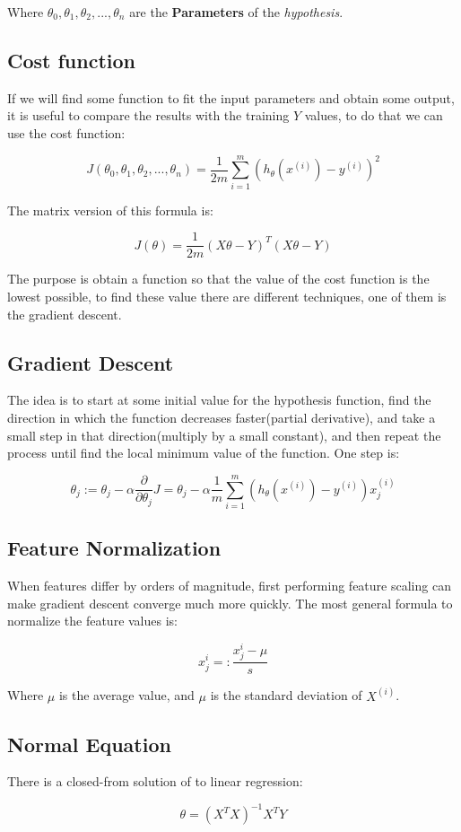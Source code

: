 \documentclass[english]{article}
\begin{document}
Where $\theta_{0},\theta_{1},\theta_{2},...,\theta_{n}$ are the
\textbf{Parameters} of the \textit{hypothesis}.

\subsection{Cost function}
If we will find some function to fit the input parameters and obtain some output,
it is useful to compare the results with the training $Y$ values, to do that we
can use the cost function:

\begin{equation}
J(\theta_{0},\theta_{1},\theta_{2},...,\theta_{n})=
\frac{1}{2m}\sum_{i=1}^{m}(h_{\theta}(x^{(i)})-y^{(i)})^{2}
\end{equation}

The matrix version of this formula is:

\begin{equation}
J(\theta)=\frac{1}{2m}(X\theta-Y)^{T}(X\theta-Y)
\end{equation}

The purpose is obtain a function so that the value of the cost function is the
lowest possible, to find these value there are different techniques, one of them
is the gradient descent.

\subsection{Gradient Descent}
The idea is to start at some initial value for the hypothesis function, find the
direction in which the function decreases faster(partial derivative), and take
a small step in that direction(multiply by a small constant), and then repeat
the process until find the local minimum value of the function. One step is:

\begin{equation}
\theta_{j}:=\theta_{j}-\alpha \frac{\partial}{\partial \theta_{j}}J=
\theta_{j}-\alpha \frac{1}{m}
\sum_{i=1}^{m}(h_{\theta}(x^{(i)})-y^{(i)}) x_{j}^{(i)}
\end{equation}

\subsection{Feature Normalization}
When features differ by orders of magnitude, first performing feature scaling
can make gradient descent converge much more quickly. The most general formula
to normalize the feature values is:

\begin{equation}
x_{j}^{i} =: \frac{ x_{j}^{i}-\mu}{s}
\end{equation}

Where $\mu$ is the average value, and $\mu$ is the standard
deviation of $X^{(i)}$.

\subsection{Normal Equation}
There is a closed-from solution of to linear regression:

\begin{equation}
  \theta = (X^{T}X)^{-1}X^{T}Y
\end{equation}
\end{document}
